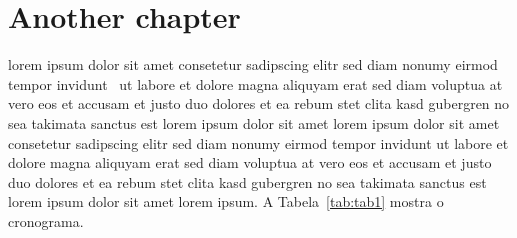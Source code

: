 \chapter{\label{chap:chap2}Another chapter}

lorem ipsum dolor sit amet consetetur sadipscing elitr sed diam
nonumy eirmod tempor invidunt~\cite{PLASSPAG81} ut labore et
dolore magna aliquyam erat sed diam voluptua at vero eos et
accusam et justo duo dolores et ea rebum stet clita kasd gubergren
no sea takimata sanctus est lorem ipsum dolor sit amet lorem ipsum
dolor sit amet consetetur sadipscing elitr sed diam nonumy eirmod
tempor invidunt ut labore et dolore magna aliquyam erat sed diam
voluptua at vero eos et accusam et justo duo dolores et ea rebum
stet clita kasd gubergren no sea takimata sanctus est lorem ipsum
dolor sit amet lorem ipsum. A Tabela~\ref{tab:tab1} mostra o
cronograma.~\cite{WIKIPIC09}

\begin{table}[htb]
\begin{center}
\caption{\label{tab:tab1}This is a table}%
\setlength{\tabcolsep}{.5cm}%
\end{center}
\end{table}

